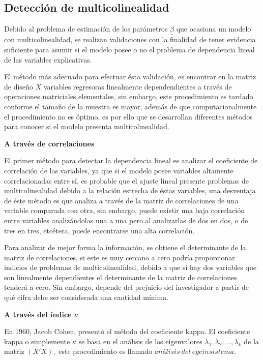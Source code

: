 \documentclass[a4paper,oneside,openany]{book}
\begin{document}
\subsection{Detección de
multicolinealidad}\label{detecciuxf3n-de-multicolinealidad}

Debido al problema de estimación de los parámetros \(\underline{\beta}\)
que ocasiona un modelo con multicolinealidad, se realizan validaciones
con la finalidad de tener evidencia suficiente para asumir si el modelo
posee o no el problema de dependencia lineal de las variables
explicativas.

El método más adecuado para efectuar ésta validación, es encontrar en la
matriz de diseño \(X\) variables regresoras linealmente dependendientes
a través de operaciones matriciales elementales, sin embargo, este
procedimiento es tardado conforme el tamaño de la muestra es mayor,
además de que computacionalmente el procedimiento no es óptimo, es por
ello que se desarrollan diferentes métodos para conocer si el modelo
presenta multicolinealidad.

\textbf{A través de correlaciones}

El primer método para detectar la dependencia lineal es analizar el
coeficiente de correlación de las variables, ya que si el modelo posee
variables altamente correlacionadas entre sí, es probable que el ajuste
lineal presente problemas de multicolinealidad debido a la relación
estrecha de éstas variables, una desventaja de éste método es que
analiza a través de la matriz de correlaciones de una variable comparada
con otra, sin embargo, puede existir una baja correlación entre
variables analizándolas una a una pero al analizarlas de dos en dos, o
de tres en tres, etcétera, puede encontrarse una alta correlación.

Para analizar de mejor forma la información, se obtiene el determinante
de la matriz de correlaciones, si este es muy cercano a cero podría
proporcionar indicios de problemas de multicolinealidad, debido a que si
hay dos variables que son linealmente dependientes el determinante de la
matriz de correlaciones tenderá a cero. Sin embargo, depende del
prejuicio del investigador a partir de qué cifra debe ser considerada
una cantidad mínima.

\textbf{A través del índice \(\kappa\)}

En 1960, Jacob Cohen, presentó el método del coeficiente kappa. El
coeficiente kappa o simplemente \(\kappa\) se basa en el análisis de los
eigenvalores \(\lambda_{1},\lambda_{2},\ldots,\lambda_{k}\) de la matriz
\((X'X),\) este procedimiento es llamado
\(análisis \ del \ egeinsistema.\)
\end{document}
